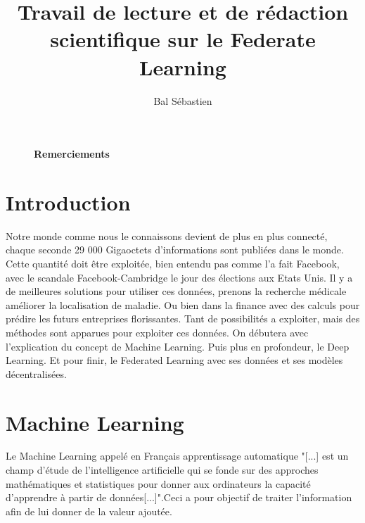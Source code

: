 \documentclass[12pt,a4paper,french]{report}
\begin{document}
\title{\Large{\Large {Travail de lecture et de rédaction scientifique sur le Federate Learning}}}

\author{Bal Sébastien}

\maketitle

\thispagestyle{empty} %

 


\begin{figure}[p]

\large\textbf{Remerciements}


\end{figure}

\tableofcontents
\thispagestyle{empty} %




\chapter{Introduction}


\fancyfoot[R]{\thepage}

Notre monde comme nous le connaissons devient de plus en plus connecté, chaque seconde 29 000 Gigaoctets d'informations sont publiées dans le monde. Cette quantité doit être exploitée, bien entendu pas comme l'a fait Facebook, avec le scandale Facebook-Cambridge le jour des élections aux Etats Unis. Il y a de meilleures solutions pour utiliser ces données, prenons la recherche médicale améliorer la localisation de maladie. Ou bien dans la finance avec des calculs pour prédire les futurs entreprises florissantes. Tant de possibilités a exploiter, mais des méthodes sont apparues pour exploiter ces données. On débutera avec l'explication du concept de Machine Learning. Puis plus en profondeur, le Deep Learning. Et pour finir, le Federated Learning avec ses données et ses modèles décentralisées.





\setcounter{page}{1} %

\chapter{Machine Learning}
Le Machine Learning appelé en Français apprentissage automatique "[...] est un champ d'étude de l'intelligence artificielle qui se fonde sur des approches mathématiques et statistiques pour donner aux ordinateurs la capacité d'apprendre à partir de données[...]".Ceci a pour objectif de traiter l'information afin de lui donner de la valeur ajoutée.\\
\end{document}
